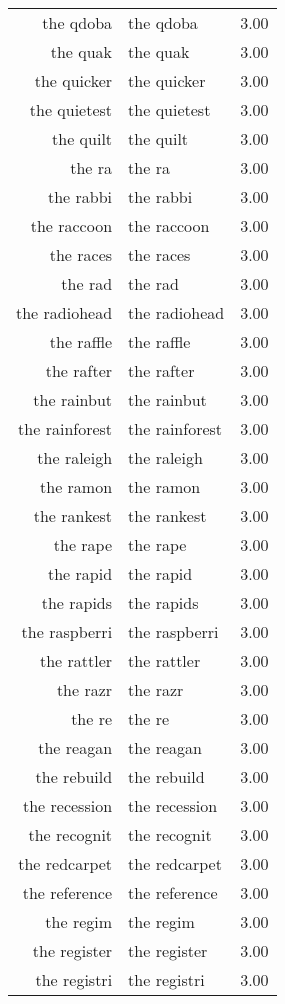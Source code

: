 \begin{table}[ht]
\begin{tabular}{rlr}
  the qdoba & the qdoba & 3.00 \\ 
  the quak & the quak & 3.00 \\ 
  the quicker & the quicker & 3.00 \\ 
  the quietest & the quietest & 3.00 \\ 
  the quilt & the quilt & 3.00 \\ 
  the ra & the ra & 3.00 \\ 
  the rabbi & the rabbi & 3.00 \\ 
  the raccoon & the raccoon & 3.00 \\ 
  the races & the races & 3.00 \\ 
  the rad & the rad & 3.00 \\ 
  the radiohead & the radiohead & 3.00 \\ 
  the raffle & the raffle & 3.00 \\ 
  the rafter & the rafter & 3.00 \\ 
  the rainbut & the rainbut & 3.00 \\ 
  the rainforest & the rainforest & 3.00 \\ 
  the raleigh & the raleigh & 3.00 \\ 
  the ramon & the ramon & 3.00 \\ 
  the rankest & the rankest & 3.00 \\ 
  the rape & the rape & 3.00 \\ 
  the rapid & the rapid & 3.00 \\ 
  the rapids & the rapids & 3.00 \\ 
  the raspberri & the raspberri & 3.00 \\ 
  the rattler & the rattler & 3.00 \\ 
  the razr & the razr & 3.00 \\ 
  the re & the re & 3.00 \\ 
  the reagan & the reagan & 3.00 \\ 
  the rebuild & the rebuild & 3.00 \\ 
  the recession & the recession & 3.00 \\ 
  the recognit & the recognit & 3.00 \\ 
  the redcarpet & the redcarpet & 3.00 \\ 
  the reference & the reference & 3.00 \\ 
  the regim & the regim & 3.00 \\ 
  the register & the register & 3.00 \\ 
  the registri & the registri & 3.00 \\ 

\end{tabular}
\end{table}
